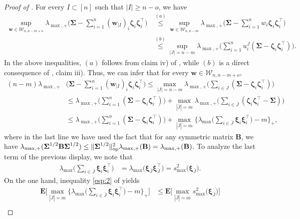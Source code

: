 \documentclass[aos,preprint,reqno]{imsart}
\newcommand\bxi{\boldsymbol\xi}
\newcommand\bzeta{\boldsymbol\zeta}
\newcommand\bSigma{\boldsymbol\Sigma}
\newcommand\bfE{\mathbf E}
\newcommand\bw{\boldsymbol w}
\theoremstyle{plain}
\theoremstyle{remark}
\begin{document}
	\begin{proof}[Proof of ]
	For every $I\subset [n]$ such that $|I| \ge n-o$, we have
	\begin{align}
			\sup_{\bw\in \mathcal W_{n,n-m+o}} 
			\lambda_{\max,+}\Big(\bSigma - \sum_{i=1}^n (\bw_{|I})_i
			\bzeta_i\bzeta_i^\top\Big)
			&\stackrel{(a)}{\le}
			\sup_{\bw\in \mathcal W_{n,n-m}} \lambda_{\max,+}\Big(\bSigma
			-\sum_{i=1}^nw_i \bzeta_i\bzeta_i^\top \Big)\\
			&\stackrel{(b)}{\le}\sup_{|J| = n-m}\lambda_{\max,+}\Big( \sum_{i=1}^n
			u^J_i(\bSigma -\bzeta_i\bzeta_i^\top)\Big).\label{eq:L31}
	\end{align}
	In the above inequalities, $(a)$ follows from claim iv)
	of , while  $(b)$ is a direct consequence
	of , claim iii).  Thus, we can infer that for every 
	$\bw\in \mathcal W_{n,n-m+o}$,
	\begin{align}
		(n-m) \lambda_{\max,+}&\Big(\bSigma - \sum_{i=1}^n (\bw_{|I})_i
			\bzeta_i\bzeta_i^\top\Big)\le \max_{|J| = n-m}\lambda_{\max,+}
			\Big(\sum_{i\in J}(\bSigma-\bzeta_i\bzeta_i^\top)\Big)\\
		&\le  \lambda_{\max,+}\bigg(\sum_{i=1}^n(\bSigma-\bzeta_i\bzeta_i^\top
			)\bigg) + \max_{|\bar J| = m} \lambda_{\max,+}\bigg(\sum_{i\in \bar J}(
			\bzeta_i\bzeta_i^\top - \bSigma)\bigg)\\
		&\le \lambda_{\max,+}\bigg(\sum_{i=1}^n(\bSigma-\bzeta_i\bzeta_i^\top
					)\bigg) + \max_{|\bar J| = m} \bigg\{\lambda_{\max}
			\bigg(\sum_{i\in \bar J}\bxi_i\bxi_i^\top \bigg)-m\bigg\}_+,
			\label{eq:L32}
	\end{align}
	where in the last line we have used the fact that for any symmetric 
	matrix $\mathbf B$, we have $\lambda_{\max,+}(\bSigma^{1/2}\mathbf B
	\bSigma^{1/2}) \le \|\bSigma^{1/2}\|^2_{\textup{op}}\lambda_{\max,+}
	(\mathbf B)= \lambda_{\max,+}(\mathbf B)$. To analyze the last term 
	of the previous display, we note that 
	\begin{align}
		\lambda_{\max}\bigg(\sum_{i\in \bar J}\bxi_i\bxi_i^\top	\bigg)
			&= \lambda_{\max}\big(\bxi_{\bar J}\bxi_{\bar J}^\top\big) = 
			s_{\max}^2\big(\bxi_{\bar J}\big).\label{eq:L33}
	\end{align}
	On the one hand, inequality \eqref{esp:2} of  yields
	\begin{align}
		\bfE\bigg[\max_{|\bar J| = m} \bigg\{\lambda_{\max}
			\bigg(\sum_{i\in \bar J}\bxi_i\bxi_i^\top \bigg)-m\bigg\}_+\bigg]
			&\le \bfE\Big[\max_{|\bar J| = m}s_{\max}^2\big(\bxi_{\bar J}\big)\Big]\\

\end{align}
\end{proof}
\end{document}
